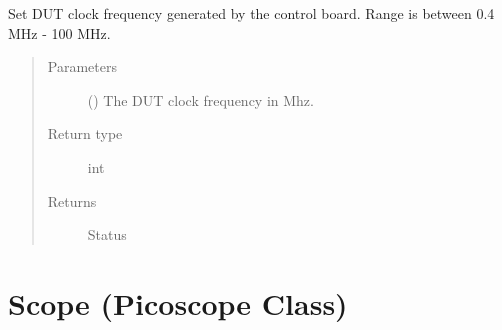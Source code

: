 \documentclass[letterpaper,10pt,english]{sphinxmanual}
\begin{document}
\begin{fulllineitems}
\begin{fulllineitems}
\begin{quote}
\begin{description}
\end{description}\end{quote}

\end{fulllineitems}


\begin{fulllineitems}
\label{\detokenize{reference_doc:fobos.Basys3Ctrl.setDUTClk}}
Set DUT clock frequency generated by the control board. Range is between 0.4 MHz - 100 MHz.
\begin{quote}\begin{description}
\item[{Parameters}] \leavevmode
{} () \textendash{} The DUT clock frequency in Mhz.

\item[{Return type}] \leavevmode
int

\item[{Returns}] \leavevmode
Status

\end{description}\end{quote}

\end{fulllineitems}


\end{fulllineitems}



\section{Scope (Picoscope Class)}
\label{\detokenize{reference_doc:scope-picoscope-class}}
\end{document}
